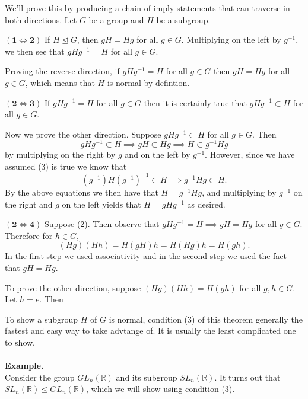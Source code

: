 \documentclass[12pt,letterpaper]{algebra_book}
\newcommand{\normal}{\unlhd}
\theoremstyle{definition}
\begin{document}
    \begin{prf}
        We'll prove this by producing a chain of imply statements that
        can traverse in both directions.
        Let $G$ be a group and $H$ be a subgroup. 
        
        \noindent $\mathbf{(1 \iff 2)}$ If $H \normal G$, then $gH = Hg$
        for all $g \in G$. Multiplying on the left by $g^{-1}$, we
        then see that $gHg^{-1} = H$ for all $g \in G$.

        Proving the reverse direction, if $gHg^{-1} = H$ for all $g \in G$
        then $gH = Hg$ for all $g \in G$, which means that $H$ is
        normal by defintion. 

        \noindent $\mathbf{(2 \iff 3)}$ If $gHg^{-1} = H$ for all $g \in G$
        then it is certainly true that $gHg^{-1} \subset H$ for all $g
        \in G$. 
        
        Now we prove the other direction. Suppose $gHg^{-1} \subset H$ for
        all $g \in G$. Then
        \[
            gHg^{-1} \subset H \implies gH \subset Hg 
            \implies H \subset g^{-1}Hg
        \]
        by multiplying on the right by $g$ and on the left by
        $g^{-1}$. However, since we have assumed (3) is true we know
        that 
        \[
            (g^{-1})H(g^{-1})^{-1} \subset H \implies g^{-1}Hg
            \subset H. 
        \] 
        By the above equations we then have that $H = g^{-1}Hg$, and
        multiplying by $g^{-1}$ on the right and $g$ on the left
        yields that $H = gHg^{-1}$ as desired.

        \noindent$\mathbf{(2 \iff 4)}$ Suppose (2). Then observe that $gHg^{-1} = H
        \implies gH = Hg$ for all $g \in G$.
        Therefore for $h \in G$, 
        \[
            (Hg)(Hh) = H(gH)h = H(Hg)h = H(gh).
        \]
        In the first step we used associativity and in the
        second step we used the fact that $gH = Hg$. 

        To prove the other direction, suppose $(Hg)(Hh) = H(gh)$ for
        all $g, h \in G$. Let $h = e$. Then 
    \end{prf}
    To show a subgroup $H$ of $G$ is normal, condition (3) of this
    theorem generally the fastest and easy way to take advtange of. It
    is usually the least complicated one to show. 
    \\
    \\
    \noindent
    \textbf{Example.}
    \\
    Consider the group $GL_n(\mathbb{R})$ and its subgroup
    $SL_n(\mathbb{R})$. It turns out that $SL_n(\mathbb{R}) \normal
    GL_n(\mathbb{R})$, which we will show using condition (3).
\end{document}
